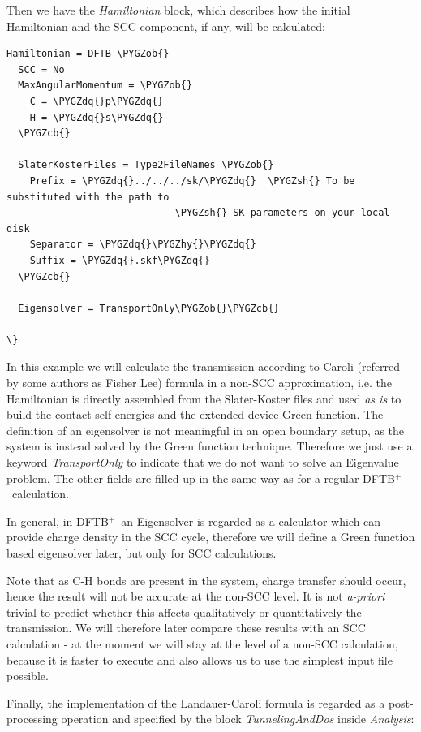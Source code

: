 \documentclass[a4paper,11pt,english]{sphinxmanual}
\newcommand{\dftbp}{\textsf{DFTB$^{\text{+}}$\ }} %
\def\PYGZob{\char`\{}
\def\PYGZcb{\char`\}}
\def\PYGZsh{\char`\#}
\def\PYGZhy{\char`\-}
\def\PYGZdq{\char`\"}
\begin{document}
{{Then we have the \emph{Hamiltonian} block, which describes how the initial
Hamiltonian and the SCC component, if any, will be calculated:

\begin{Verbatim}[commandchars=\\\{\}]
Hamiltonian = DFTB \PYGZob{}
  SCC = No
  MaxAngularMomentum = \PYGZob{}
    C = \PYGZdq{}p\PYGZdq{}
    H = \PYGZdq{}s\PYGZdq{}
  \PYGZcb{}

  SlaterKosterFiles = Type2FileNames \PYGZob{}
    Prefix = \PYGZdq{}../../../sk/\PYGZdq{}  \PYGZsh{} To be substituted with the path to
                             \PYGZsh{} SK parameters on your local disk
    Separator = \PYGZdq{}\PYGZhy{}\PYGZdq{}
    Suffix = \PYGZdq{}.skf\PYGZdq{}
  \PYGZcb{}

  Eigensolver = TransportOnly\PYGZob{}\PYGZcb{}

\}
\end{Verbatim}

In this example we will calculate the transmission according to Caroli
(referred by some authors as Fisher Lee) formula in a non-SCC
approximation, i.e. the Hamiltonian is directly assembled from the
Slater-Koster files and used \emph{as is} to build the contact self
energies and the extended device Green function.  The definition of
an eigensolver is not meaningful in an open boundary setup, as the
system is instead solved by the Green function technique. Therefore
we just use a keyword \emph{TransportOnly} to indicate that we do not want
to solve an Eigenvalue problem. The other fields are filled up in the
same way as for a regular \dftbp calculation.

In general, in \dftbp an Eigensolver is regarded as a calculator
which can provide charge density in the SCC cycle, therefore we will
define a Green function based eigensolver later, but only for SCC
calculations.

Note that as C-H bonds are present in the system, charge transfer
should occur, hence the result will not be accurate at the non-SCC
level. It is not \emph{a-priori} trivial to predict whether this affects
qualitatively or quantitatively the transmission. We will therefore
later compare these results with an SCC calculation - at the moment we
will stay at the level of a non-SCC calculation, because it is faster
to execute and also allows us to use the simplest input file possible.

Finally, the implementation of the Landauer-Caroli formula is regarded
as a post-processing operation and specified by the block
\emph{TunnelingAndDos} inside \emph{Analysis}:

}}
\end{document}
